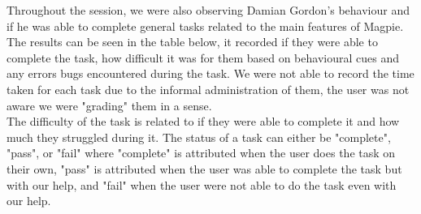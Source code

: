 \noindent Throughout the session, we were also observing Damian Gordon's behaviour and if he was able to complete general tasks related to the main features of Magpie. The results can be seen in the table below, it recorded if they were able to complete the task, how difficult it was for them based on behavioural cues and any errors bugs encountered during the task. We were not able to record the time taken for each task due to the informal administration of them, the user was not aware we were "grading" them in a sense.\\
The difficulty of the task is related to if they were able to complete it and how much they struggled during it. The status of a task can either be "complete", "pass", or "fail" where "complete" is attributed when the user does the task on their own, "pass" is attributed when the user was able to complete the task but with our help, and "fail" when the user were not able to do the task even with our help. \\

